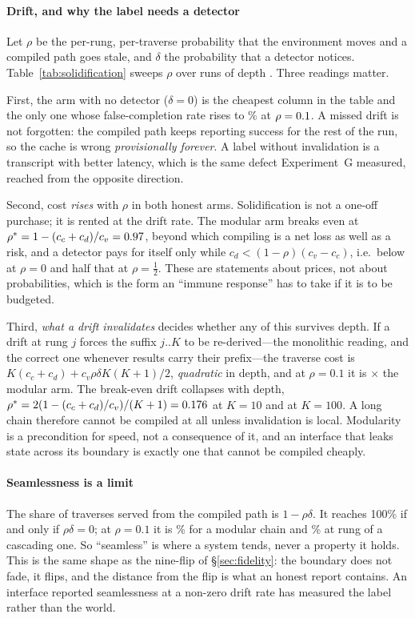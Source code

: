\documentclass[conference]{IEEEtran}
\theoremstyle{definition}
\begin{document}
\paragraph{Drift, and why the label needs a detector} Let $\rho$ be the per-rung,
per-traverse probability that the environment moves and a compiled path goes stale,
and $\delta$ the probability that a detector notices. Table~\ref{tab:solidification}
sweeps $\rho$ over \sdRuns{} runs of depth \sdDepth. Three readings matter.

First, the arm with no detector ($\delta=0$) is the cheapest column in the table and
the only one whose false-completion rate rises to \sdNaiveFcr\% at
$\rho=0.1$. A missed drift is not forgotten: the compiled path keeps
reporting success for the rest of the run, so the cache is wrong \emph{provisionally
forever}. A label without invalidation is a transcript with better latency, which is
the same defect Experiment~G measured, reached from the opposite direction.

Second, cost \emph{rises} with $\rho$ in both honest arms. Solidification is not a
one-off purchase; it is rented at the drift rate. The modular arm breaks even at
$\rho^{*}=1-(c_c+c_d)/c_v=0.97$, beyond which compiling is a net loss as
well as a risk, and a detector pays for itself only while
$c_d<(1-\rho)(c_v-c_c)$, i.e.\ below \sdBreakEven{} at $\rho=0$ and half that at
$\rho=\tfrac12$. These are statements about prices, not about probabilities, which is
the form an ``immune response'' has to take if it is to be budgeted.

Third, \emph{what a drift invalidates} decides whether any of this survives depth. If
a drift at rung $j$ forces the suffix $j..K$ to be re-derived---the monolithic
reading, and the correct one whenever results carry their prefix---the traverse cost
is $K(c_c+c_d)+c_v\rho\delta K(K+1)/2$, \emph{quadratic} in depth, and at
$\rho=\num{0.1}$ it is \sdCascadePenalty$\times$ the modular arm. The break-even drift
collapses with depth, $\rho^{*}=2(1-(c_c+c_d)/c_v)/(K+1)=0.176$ at
$K=10$ and \sdRhoCascadeHundred{} at $K=100$. A long chain therefore cannot be
compiled at all unless invalidation is local. Modularity is a precondition for speed,
not a consequence of it, and an interface that leaks state across its boundary is
exactly one that cannot be compiled cheaply.

\paragraph{Seamlessness is a limit} The share of traverses served from the compiled
path is $1-\rho\delta$. It reaches \num{100}\% if and only if $\rho\delta=0$;
at $\rho=\num{0.1}$ it is \sdReplayRate\% for a modular chain and \sdCascadeRate\% at
rung \sdDepth{} of a cascading one. So ``seamless'' is where a system tends, never a
property it holds. This is the same shape as the nine-flip of
\S\ref{sec:fidelity}: the boundary does not fade, it flips, and the distance from the
flip is what an honest report contains. An interface reported seamlessness at a
non-zero drift rate has measured the label rather than the world.
\end{document}
